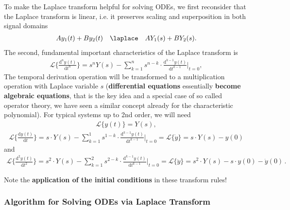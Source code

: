 To make the Laplace transform helpful for solving ODEs, we first reconsider
that the Laplace transform is linear, i.e. it preserves scaling and
superposition in both signal domains
\begin{align}
A y_1(t) + B y_2(t) \quad \laplace \quad A Y_1(s) + B Y_2(s).
\end{align}
The second, fundamental important characteristics of the Laplace transform is
\begin{align}
\mathcal{L}\{\frac{\mathrm{d}^n y(t)}{\mathrm{d} t^n}\}=
s^n Y(s) - \sum_{k=1}^{n} s^{n-k} \cdot
\frac{\mathrm{d}^{k-1} y(t)}{\mathrm{d} t^{k-1}}\bigg|_{t=0},
\end{align}
The temporal derivation operation will be transformed to a multiplication
operation with Laplace variable $s$ (\textbf{differential equations} essentially \textbf{become
algebraic equations}, that is the key idea and a special case of
so called operator theory, we have seen a similar concept already for the
characteristic polynomial).
%
For typical systems up to 2nd order, we will need
\begin{align}
\label{eq:Laplace0thd}
\boxed{\mathcal{L}\{{y(t)}\} = Y(s)},
\end{align}
\begin{align}
\label{eq:Laplace1std}
\mathcal{L}\{\frac{\mathrm{d} y(t)}{\mathrm{d} t}\}=
s \cdot Y(s) - \sum_{k=1}^{1} s^{1-k} \cdot
\frac{\mathrm{d}^{k-1} y(t)}{\mathrm{d} t^{k-1}}\bigg|_{t=0}
= \boxed{\mathcal{L}\{\dot{y}\} = s \cdot Y(s) - y(0)}
\end{align}
and
\begin{align}
\label{eq:Laplace2ndd}
\mathcal{L}\{\frac{\mathrm{d}^2 y(t)}{\mathrm{d} t^2}\}=
s^2 \cdot Y(s) - \sum_{k=1}^{2} s^{2-k} \cdot
\frac{\mathrm{d}^{k-1} y(t)}{\mathrm{d} t^{k-1}}\bigg|_{t=0}
= \boxed{\mathcal{L}\{\ddot{y}\} = s^2 \cdot Y(s) - s \cdot y(0) - \dot{y}(0)}\,.
\end{align}

Note the \textbf{application of the initial conditions} in these transform rules!

\subsubsection{Algorithm for Solving ODEs via Laplace Transform}

